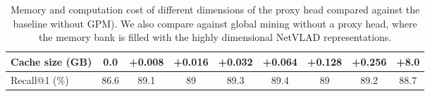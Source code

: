 \documentclass{bmvc2k}
\begin{document}
\begin{table}[th]
{\begin{tabular}{l||c||cccccc||c}
Cache size (GB)       & 0.0                                                         & +0.008          & +0.016          & +0.032          & +0.064          & +0.128          & +0.256          & +8.0                                                                         \\ \hline
Recall@1 (\%)         & 86.6                                                        & 89.1           & 89             & 89.3           & 89.4           & 89             & 89.2           & 88.7                                                                        \\ \hline
\end{tabular}
}
\vspace{7pt}
\caption{\small Memory and computation cost of different dimensions of the proxy head compared against the baseline without GPM). We also compare against global mining without a proxy head, where the memory bank is filled with the highly dimensional NetVLAD representations.}
\label{tab:table2}
\end{table}
\end{document}
